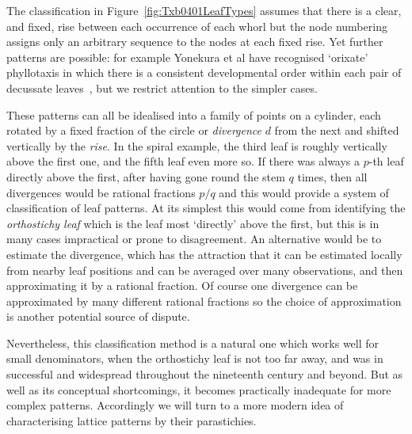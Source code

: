 
The classification in Figure~\ref{fig:Txb0401LeafTypes} assumes that there is a clear, and fixed, rise between each occurrence of each whorl but the node numbering assigns only an arbitrary sequence to the nodes at each fixed rise. Yet further patterns are possible: for example Yonekura et al have recognised `orixate' phyllotaxis in which there is a consistent developmental order within each pair of decussate leaves~\cite{yonekuraMathematicalModelStudies2019}, but we restrict attention to the simpler cases. 

These patterns can all be idealised into a family of points on a cylinder, each rotated by a fixed fraction of the circle or \emph{divergence} $d$ from the next and shifted vertically by the \emph{rise}. 
In the spiral example, the third leaf is roughly vertically above the first one, and the fifth leaf even more so. 
If there was always a $p$-th leaf directly above the first, after having gone round the stem $q$ times, then all divergences would be rational fractions $p/q$  and this would provide a system of classification of leaf patterns. At its simplest this would come from identifying the \emph{orthostichy leaf} which is the leaf most `directly' above the first, but this is in many cases impractical or 
prone to disagreement. An alternative would be to estimate the divergence, which has the attraction that it can be estimated locally from nearby leaf positions and can be averaged over many observations, and 
then approximating it by a rational fraction. Of course one divergence can be approximated by many different rational fractions so the choice of approximation is another potential source of dispute.



Nevertheless, this classification method is a natural one which works well for small denominators,  when the orthostichy leaf is not too far away, and was in successful and widespread throughout the nineteenth century and beyond. But as well as its conceptual shortcomings, it becomes practically inadequate for more complex patterns. Accordingly we will turn to a more modern idea of characterising lattice patterns by their parastichies.

